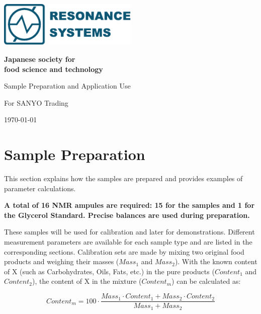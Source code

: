 \documentclass[a4paper,12pt]{article}
\begin{document}
\thispagestyle{empty}
\includegraphics[width=0.5\textwidth]{Logo.pdf}

\vspace{8cm}

\begin{center}
{\huge\textbf{Japanese society for \\
food science and technology}}
\end{center}
\vspace{1cm}


{\LARGE
Sample Preparation and Application Use

\vspace{1cm}

For SANYO Trading
}
\vfill

\today




\newpage
\thispagestyle{empty}
\AddToShipoutPictureBG{\usebox\logoone}
\tableofcontents


\newpage
\section{Sample Preparation}
\label{sec:Samples}

This section explains how the samples are prepared and provides examples of parameter calculations. 

\textbf{A total of 16 NMR ampules are required: 15 for the samples and 1 for the Glycerol Standard. Precise balances are used during preparation.}

These samples will be used for calibration and later for demonstrations. 
Different measurement parameters are available for each sample type and are listed in the corresponding sections. 
Calibration sets are made by mixing two original food products and weighing their masses ($Mass_1$ and $Mass_2$). 
With the known content of X (such as Carbohydrates, Oils, Fats, etc.) in the pure products ($Content_1$ and $Content_2$), the content of X in the mixture ($Content_m$) can be calculated as:

\begin{equation}
    Content_m = 100 \cdot \frac{Mass_1 \cdot Content_1 + Mass_2 \cdot Content_2}{Mass_1 + Mass_2}
\end{equation}
\end{document}
